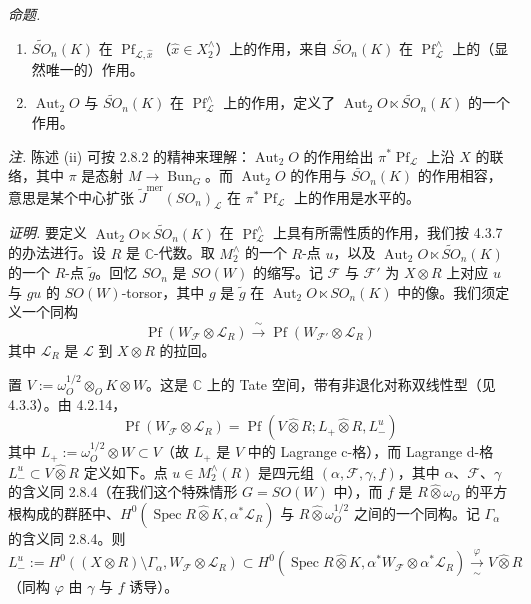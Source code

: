  \emph{命题.}
\begin{enumerate}[label=(\roman*),leftmargin=2.2em]
\item $\tilde{SO}_{n}(K)$ 在 $\operatorname{Pf}_{\mathcal{L},\hat x}$（$\hat x\in X_{2}^{\wedge}$）上的作用，来自 $\tilde{SO}_{n}(K)$ 在 $\operatorname{Pf}_{\mathcal{L}}^{\wedge}$ 上的（显然唯一的）作用。
\item $\operatorname{Aut}_{2}O$ 与 $\tilde{SO}_{n}(K)$ 在 $\operatorname{Pf}_{\mathcal{L}}^{\wedge}$ 上的作用，定义了 $\operatorname{Aut}_{2}O\ltimes\tilde{SO}_{n}(K)$ 的一个作用。
\end{enumerate}

\emph{注.} 陈述 (ii) 可按 2.8.2 的精神来理解：$\operatorname{Aut}_{2}O$ 的作用给出 $\pi^{*}\operatorname{Pf}_{\mathcal{L}}$ 上沿 $X$ 的联络，其中 $\pi$ 是态射 $M\to\operatorname{Bun}_{G}$。而 $\operatorname{Aut}_{2}O$ 的作用与 $\tilde{SO}_{n}(K)$ 的作用相容，意思是某个中心扩张 $\tilde{J}^{\mathrm{mer}}(SO_{n})_{\mathcal{L}}$ 在 $\pi^{*}\operatorname{Pf}_{\mathcal{L}}$ 上的作用是水平的。

\emph{证明.} 要定义 $\operatorname{Aut}_{2}O\ltimes\tilde{SO}_{n}(K)$ 在 $\operatorname{Pf}_{\mathcal{L}}^{\wedge}$ 上具有所需性质的作用，我们按 4.3.7 的办法进行。设 $R$ 是 $\mathbb{C}$-代数。取 $M_{2}^{\wedge}$ 的一个 $R$-点 $u$，以及 $\operatorname{Aut}_{2}O\ltimes\tilde{SO}_{n}(K)$ 的一个 $R$-点 $\tilde{g}$。回忆 $SO_{n}$ 是 $SO(W)$ 的缩写。记 $\mathcal{F}$ 与 $\mathcal{F}'$ 为 $X\otimes R$ 上对应 $u$ 与 $gu$ 的 $SO(W)$-torsor，其中 $g$ 是 $\tilde{g}$ 在 $\operatorname{Aut}_{2}O\ltimes SO_{n}(K)$ 中的像。我们须定义一个同构
\begin{equation}\tag{206}
\operatorname{Pf}(W_{\mathcal{F}}\otimes\mathcal{L}_{R})\xrightarrow{\ \sim\ }\operatorname{Pf}(W_{\mathcal{F}'}\otimes\mathcal{L}_{R})
\end{equation}
其中 $\mathcal{L}_{R}$ 是 $\mathcal{L}$ 到 $X\otimes R$ 的拉回。


置 $V:=\omega_{O}^{1/2}\otimes_{O}K\otimes W$。这是 $\mathbb{C}$ 上的 Tate 空间，带有非退化对称双线性型（见 4.3.3）。由 4.2.14，
\begin{equation}\tag{207}
\operatorname{Pf}(W_{\mathcal{F}}\otimes\mathcal{L}_{R})=\operatorname{Pf}(V\hat\otimes R;L_{+}\hat\otimes R,L^{u}_{-})
\end{equation}
其中 $L_{+}:=\omega_{O}^{1/2}\otimes W\subset V$（故 $L_{+}$ 是 $V$ 中的 Lagrange c-格），而 Lagrange d-格 $L^{u}_{-}\subset V\hat\otimes R$ 定义如下。点 $u\in M_{2}^{\wedge}(R)$ 是四元组 $(\alpha,\mathcal{F},\gamma,f)$，其中 $\alpha$、$\mathcal{F}$、$\gamma$ 的含义同 2.8.4（在我们这个特殊情形 $G=SO(W)$ 中），而 $f$ 是 $R\hat\otimes\omega_{O}$ 的平方根构成的群胚中、$H^{0}(\operatorname{Spec}R\hat\otimes K,\alpha^{*}\mathcal{L}_{R})$ 与 $R\hat\otimes\omega_{O}^{1/2}$ 之间的一个同构。记 $\Gamma_{\alpha}$ 的含义同 2.8.4。则
\[
L^{u}_{-}:=H^{0}((X\otimes R)\setminus\Gamma_{\alpha},W_{\mathcal{F}}\otimes\mathcal{L}_{R})\subset H^{0}(\operatorname{Spec}R\hat\otimes K,\alpha^{*}W_{\mathcal{F}}\otimes\alpha^{*}\mathcal{L}_{R})\xrightarrow[\ \sim\ ]{\varphi}V\hat\otimes R
\]
（同构 $\varphi$ 由 $\gamma$ 与 $f$ 诱导）。

